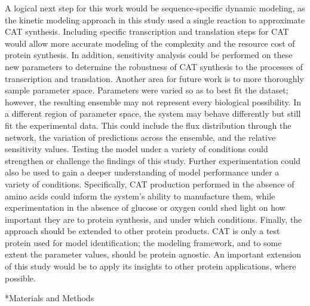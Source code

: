 \documentclass[12pt]{article}
\makeatletter
\renewcommand\section{\@startsection
	{subsection}{2}{0mm}
	{-0.2in}
	{0.05\baselineskip}
	{\normalfont\large\bfseries}}
\makeatother
\begin{document}
A logical next step for this work would be sequence-specific dynamic modeling, as the kinetic modeling approach in this study used a single reaction to approximate CAT synthesis.
Including specific transcription and translation steps for CAT would allow more accurate modeling of the complexity and the resource cost of protein synthesis.
In addition, sensitivity analysis could be performed on these new parameters to determine the robustness of CAT synthesis to the processes of transcription and translation.
Another area for future work is to more thoroughly sample parameter space.
Parameters were varied so as to best fit the dataset; however, the resulting ensemble may not represent every biological possibility.
In a different region of parameter space, the system may behave differently but still fit the experimental data.
This could include the flux distribution through the network, the variation of predictions across the ensemble, and the relative sensitivity values.
Testing the model under a variety of conditions could strengthen or challenge the findings of this study.
Further experimentation could also be used to gain a deeper understanding of model performance under a variety of conditions.
Specifically, CAT production performed in the absence of amino acids could inform the system's ability to manufacture them, while experimentation in the absence of glucose or oxygen could shed light on how important they are to protein synthesis, and under which conditions.
Finally, the approach should be extended to other protein products.
CAT is only a test protein used for model identification; the modeling framework, and to some extent the parameter values, should be protein agnostic.
An important extension of this study would be to apply its insights to other protein applications, where possible.

\clearpage

\section*{Materials and Methods}
\end{document}
